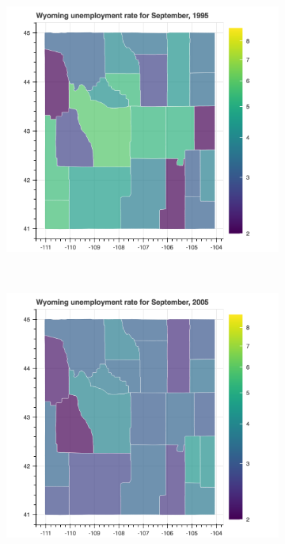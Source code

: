 \documentclass[11pt,letterpaper]{article}
\begin{document}
\begin{figure}[h!]
\centering
\begin{subfigure}{0.3\textwidth}
\includegraphics[width=1.2\linewidth]{wy_unemp_1995}
\end{subfigure}
~
\begin{subfigure}{0.3\textwidth}
\includegraphics[width=1.2\linewidth]{wy_unemp_2005}
\end{subfigure}

\end{figure}
\end{document}
